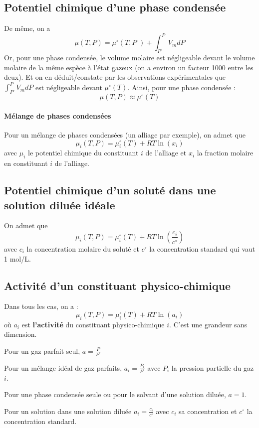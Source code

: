 \documentclass[french]{book}
\theoremstyle{plain}
\theoremstyle{definition}
\theoremstyle{remark}
\begin{document}
\subsection{Potentiel chimique d'une phase condensée}
De même, on a $$\mu(T,P)=\mu^\circ(T,P^\circ)+\int_{P^\circ}^{P}V_mdP$$ Or, pour une phase condensée, le volume molaire est négligeable devant le volume molaire de la même espèce à l'état gazeux (on a environ un facteur 1000 entre les deux). Et on en déduit/constate par les observations expérimentales que $\displaystyle\int_{P^\circ}^{P}V_mdP$ est négligeable devant $\mu^\circ(T)$. Ainsi, pour une phase condensée : $$\mu(T,P)\approx\mu^\circ(T)$$
\paragraph{Mélange de phases condensées} Pour un mélange de phases condensées (un alliage par exemple), on admet que $$\mu_i(T,P)=\mu_i^\circ(T)+RT\ln(x_i)$$ avec $\mu_i$ le potentiel chimique du constituant $i$ de l'alliage et $x_i$ la fraction molaire en constituant $i$ de l'alliage.
\subsection{Potentiel chimique d'un soluté dans une solution diluée idéale}
On admet que $$\mu_i(T,P)=\mu_i^\circ(T)+RT\ln\left(\frac{c_i}{c^\circ}\right)$$ avec $c_i$ la concentration molaire du soluté et $c^\circ$ la concentration standard qui vaut 1 mol/L.
\subsection{Activité d'un constituant physico-chimique}
Dans tous les cas, on a : $$\mu_i(T,P)=\mu_i^\circ(T)+RT\ln(a_i)$$ où $a_i$ est \textbf{l'activité} du constituant physico-chimique $i$. C'est une grandeur sans dimension. \\ \par Pour un gaz parfait seul, $a=\displaystyle\frac{P}{P^\circ}$ \\ \par Pour un mélange idéal de gaz parfaits, $a_i=\displaystyle\frac{P_i}{P^\circ}$ avec $P_i$ la pression partielle du gaz $i$. \\ \par Pour une phase condensée seule ou pour le solvant d'une solution diluée, $a=1$. \\ \par Pour un solution dans une solution diluée $a_i=\displaystyle\frac{c_i}{c^\circ}$ avec $c_i$ sa concentration et $c^\circ$ la concentration standard.
\end{document}
